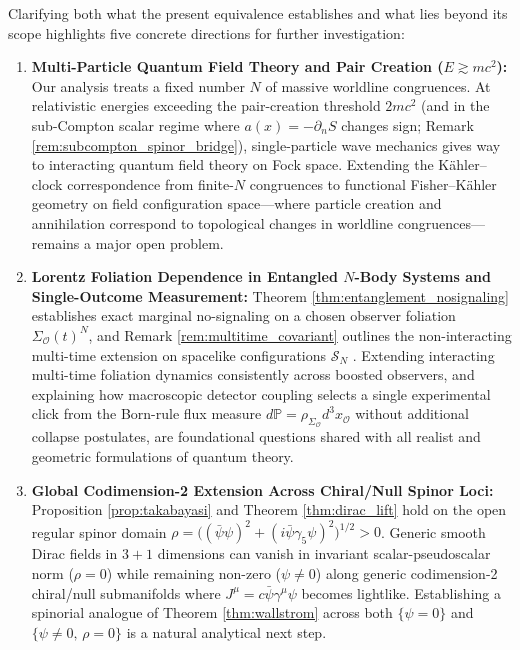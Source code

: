 \documentclass[11pt, a4paper]{article}
\theoremstyle{definition}
\begin{document}
Clarifying both what the present equivalence establishes and what lies beyond its scope highlights five concrete directions for further investigation:
\begin{enumerate}[label=\arabic*., itemsep=0.35em]
    \item \textbf{Multi-Particle Quantum Field Theory and Pair Creation ($E \gtrsim mc^2$):} Our analysis treats a fixed number $N$ of massive worldline congruences. At relativistic energies exceeding the pair-creation threshold $2mc^2$ (and in the sub-Compton scalar regime where $a(x) = -\partial_n S$ changes sign; Remark \ref{rem:subcompton_spinor_bridge}), single-particle wave mechanics gives way to interacting quantum field theory on Fock space. Extending the K\"{a}hler--clock correspondence from finite-$N$ congruences to functional Fisher--K\"{a}hler geometry on field configuration space---where particle creation and annihilation correspond to topological changes in worldline congruences---remains a major open problem.
    \item \textbf{Lorentz Foliation Dependence in Entangled $N$-Body Systems and Single-Outcome Measurement:} Theorem \ref{thm:entanglement_nosignaling} establishes exact marginal no-signaling on a chosen observer foliation $\Sigma_{\mathcal{O}}(t)^N$, and Remark \ref{rem:multitime_covariant} outlines the non-interacting multi-time extension on spacelike configurations $\mathscr{S}_N$ \cite{Lienert2017}. Extending interacting multi-time foliation dynamics consistently across boosted observers, and explaining how macroscopic detector coupling selects a single experimental click from the Born-rule flux measure $d\mathbb{P} = \rho_{\Sigma_{\mathcal{O}}}d^3x_{\mathcal{O}}$ without additional collapse postulates, are foundational questions shared with all realist and geometric formulations of quantum theory.
    \item \textbf{Global Codimension-2 Extension Across Chiral/Null Spinor Loci:} Proposition \ref{prop:takabayasi} and Theorem \ref{thm:dirac_lift} hold on the open regular spinor domain $\rho = \big((\bar{\psi}\psi)^2 + (i\bar{\psi}\gamma_5\psi)^2\big)^{1/2} > 0$. Generic smooth Dirac fields in $3+1$ dimensions can vanish in invariant scalar-pseudoscalar norm ($\rho = 0$) while remaining non-zero ($\psi \neq 0$) along generic codimension-2 chiral/null submanifolds where $J^\mu = c\bar{\psi}\gamma^\mu\psi$ becomes lightlike. Establishing a spinorial analogue of Theorem \ref{thm:wallstrom} across both $\{\psi = 0\}$ and $\{\psi \neq 0,\, \rho = 0\}$ is a natural analytical next step.

\end{enumerate}
\end{document}
